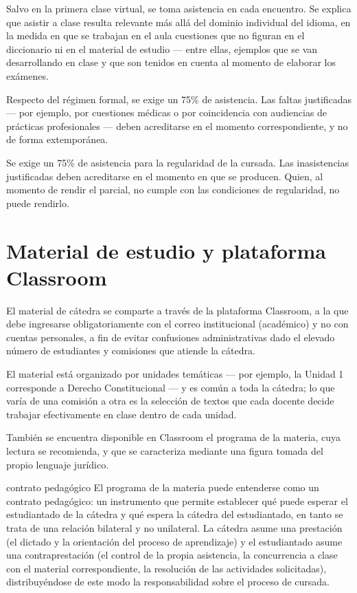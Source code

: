 \documentclass[12pt,oneside]{book}
\begin{document}
Salvo en la primera clase virtual, se toma asistencia en cada encuentro. Se explica que asistir a clase resulta relevante más allá del dominio individual del idioma, en la medida en que se trabajan en el aula cuestiones que no figuran en el diccionario ni en el material de estudio --- entre ellas, ejemplos que se van desarrollando en clase y que son tenidos en cuenta al momento de elaborar los exámenes.

Respecto del régimen formal, se exige un 75\% de asistencia. Las faltas justificadas --- por ejemplo, por cuestiones médicas o por coincidencia con audiencias de prácticas profesionales --- deben acreditarse en el momento correspondiente, y no de forma extemporánea.

\begin{important}
Se exige un 75\% de asistencia para la regularidad de la cursada. Las inasistencias justificadas deben acreditarse en el momento en que se producen. Quien, al momento de rendir el parcial, no cumple con las condiciones de regularidad, no puede rendirlo.
\end{important}

\section{Material de estudio y plataforma Classroom}

El material de cátedra se comparte a través de la plataforma Classroom, a la que debe ingresarse obligatoriamente con el correo institucional (académico) y no con cuentas personales, a fin de evitar confusiones administrativas dado el elevado número de estudiantes y comisiones que atiende la cátedra.

El material está organizado por unidades temáticas --- por ejemplo, la Unidad 1 corresponde a Derecho Constitucional --- y es común a toda la cátedra; lo que varía de una comisión a otra es la selección de textos que cada docente decide trabajar efectivamente en clase dentro de cada unidad.

También se encuentra disponible en Classroom el programa de la materia, cuya lectura se recomienda, y que se caracteriza mediante una figura tomada del propio lenguaje jurídico.

\begin{definition}{contrato pedagógico}
El programa de la materia puede entenderse como un contrato pedagógico: un instrumento que permite establecer qué puede esperar el estudiantado de la cátedra y qué espera la cátedra del estudiantado, en tanto se trata de una relación bilateral y no unilateral. La cátedra asume una prestación (el dictado y la orientación del proceso de aprendizaje) y el estudiantado asume una contraprestación (el control de la propia asistencia, la concurrencia a clase con el material correspondiente, la resolución de las actividades solicitadas), distribuyéndose de este modo la responsabilidad sobre el proceso de cursada.
\end{definition}
\end{document}
